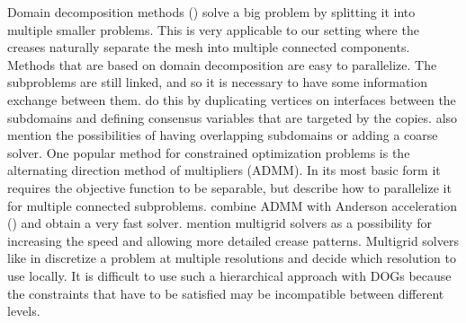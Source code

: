 \documentclass[a4paper,twoside,12pt,nochapterprefix]{scrbook}
\begin{document}
Domain decomposition methods (\cite{DDM_book}) solve a big problem by splitting it into multiple smaller problems. This is very applicable to our setting where the creases naturally separate the mesh into multiple connected components. Methods that are based on domain decomposition are easy to parallelize. The subproblems are still linked, and so it is necessary to have some information exchange between them. \cite{unused_paper} do this by duplicating vertices on interfaces between the subdomains and defining consensus variables that are targeted by the copies. \cite{DDM_book} also mention the possibilities of having overlapping subdomains or adding a coarse solver.\newline
One popular method for constrained optimization problems is the alternating direction method of multipliers (ADMM). In its most basic form it requires the objective function to be separable, but \cite{Deng2017ParallelMA} describe how to parallelize it for multiple connected subproblems. \cite{Zhang_2019} combine ADMM  with Anderson acceleration (\cite{Peng_2018}) and obtain a very fast solver.\newline
\cite{Rabinovich:CurvedFolds:2019} mention multigrid solvers as a possibility for increasing the speed and allowing more detailed crease patterns. Multigrid solvers like in \cite{kazhdan_multigrid} discretize a problem at multiple resolutions and decide which resolution to use locally. It is difficult to use such a hierarchical approach with DOGs because the constraints that have to be satisfied may be incompatible between different levels.\newline

\end{document}
